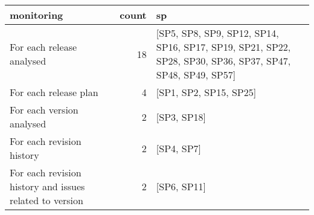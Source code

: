 \begin{tabular}{lrl}
\toprule
                                              monitoring &  count &                                                                                                         sp \\
\midrule
                               For each release analysed &     18 &  [SP5, SP8, SP9, SP12, SP14, SP16, SP17, SP19, SP21, SP22, SP28, SP30, SP36, SP37, SP47, SP48, SP49, SP57] \\
                                   For each release plan &      4 &                                                                                     [SP1, SP2, SP15, SP25] \\
                               For each version analysed &      2 &                                                                                                [SP3, SP18] \\
                               For each revision history &      2 &                                                                                                 [SP4, SP7] \\
 For each revision history and issues related to version &      2 &                                                                                                [SP6, SP11] \\
\bottomrule
\end{tabular}
